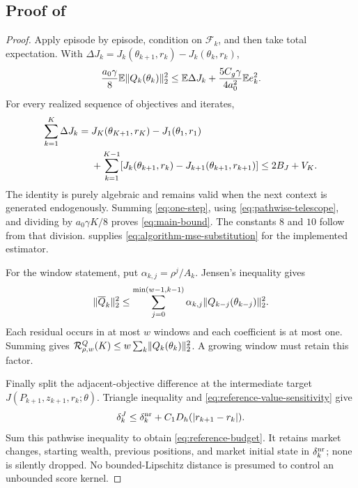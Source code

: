 \documentclass[11pt]{article}
\newcommand{\E}{\mathbb E}
\newcommand{\1}{\mathbf 1}
\DeclarePairedDelimiter{\norm}{\lVert}{\rVert}
\newcommand{\cF}{\mathcal F}
\newcommand{\Reg}{\mathcal R}
\begin{document}
\subsection{Proof of \texorpdfstring{}{the online residual theorem}}
\begin{proof}
Apply  episode by episode, condition on $\cF_k$, and then take total expectation. With $\Delta J_k=J_k(\theta_{k+1},r_{k})-J_k(\theta_k,r_{k})$,
\begin{equation}\label{eq:one-step}
 \frac{a_0\gamma}{8}\E\norm{Q_k(\theta_k)}_2^2
 \le\E\Delta J_k+\frac{5C_g\gamma}{4a_0^2}\E e_k^2.
\end{equation}
For every realized sequence of objectives and iterates,
\begin{align}
 \sum_{k=1}^K\Delta J_k
 ={}&J_K(\theta_{K+1},r_{K})-J_1(\theta_1,r_{1})\notag\\
 &+\sum_{k=1}^{K-1}
 [J_k(\theta_{k+1},r_{k})-J_{k+1}(\theta_{k+1},r_{k+1})]
 \le2B_J+V_K.
 \label{eq:pathwise-telescope}
\end{align}
The identity is purely algebraic and remains valid when the next context is generated endogenously. Summing \eqref{eq:one-step}, using \eqref{eq:pathwise-telescope}, and dividing by $a_0\gamma K/8$ proves \eqref{eq:main-bound}. The constants $8$ and $10$ follow from that division.  supplies \eqref{eq:algorithm-mse-substitution} for the implemented estimator.

For the window statement, put $\alpha_{k,j}=\rho^j/A_k$. Jensen's inequality gives
\[
 \norm{\overline Q_k}_2^2
 \le\sum_{j=0}^{\min(w-1,k-1)}\alpha_{k,j}
 \norm{Q_{k-j}(\theta_{k-j})}_2^2.
\]
Each residual occurs in at most $w$ windows and each coefficient is at most one. Summing gives $\Reg_{\rho,w}^Q(K)\le w\sum_k\norm{Q_k(\theta_k)}_2^2$. A growing window must retain this factor.

Finally split the adjacent-objective difference at the intermediate target $J(P_{k+1},z_{k+1},r_k;\theta)$. Triangle inequality and \eqref{eq:reference-value-sensitivity} give
\[
 \delta_k^{J}\le \delta_k^{\rm nr}+C_1D_h(|r_{k+1}-r_k|).
\]
Sum this pathwise inequality to obtain \eqref{eq:reference-budget}. It retains market changes, starting wealth, previous positions, and market initial state in $\delta_k^{\rm nr}$; none is silently dropped. No bounded-Lipschitz distance is presumed to control an unbounded score kernel.
\end{proof}
\end{document}
